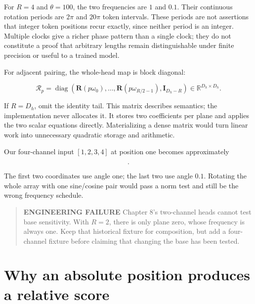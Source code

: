 For \(R=4\) and \(\theta=100\), the two frequencies are \(1\) and
\(0.1\). Their continuous rotation periods are \(2\pi\) and \(20\pi\)
token intervals. These periods are not assertions that integer token
positions recur exactly, since neither period is an integer. Multiple
clocks give a richer phase pattern than a single clock; they do not
constitute a proof that arbitrary lengths remain distinguishable under
finite precision or useful to a trained model.

For adjacent pairing, the whole-head map is block diagonal:

\begin{equation}
\mathcal{R}_p=
\operatorname{diag}\!\left(
\mathbf{R}(p\omega_0),\ldots,
\mathbf{R}(p\omega_{R/2-1}),\mathbf{I}_{D_h-R}\right)
\in\mathbb{R}^{D_h\times D_h}.
\end{equation}

If \(R=D_h\), omit the identity tail. This matrix describes semantics;
the implementation never allocates it. It stores two coefficients per
plane and applies the two scalar equations directly. Materializing a
dense matrix would turn linear work into unnecessary quadratic storage
and arithmetic.

Our four-channel input \([1,2,3,4]\) at position one becomes
approximately

\begin{equation}
[-1.142640,\;1.922076,\;2.585679,\;4.279517].
\end{equation}

The first two coordinates use angle one; the last two use angle \(0.1\).
Rotating the whole array with one sine/cosine pair would pass a norm
test and still be the wrong frequency schedule.

\begin{quote}
\textbf{ENGINEERING FAILURE} Chapter 8's two-channel heads cannot test
base sensitivity. With \(R=2\), there is only plane zero, whose
frequency is always one. Keep that historical fixture for composition,
but add a four-channel fixture before claiming that changing the base
has been tested.
\end{quote}

\section{Why an absolute position produces a relative
score}\label{why-an-absolute-position-produces-a-relative-score}



